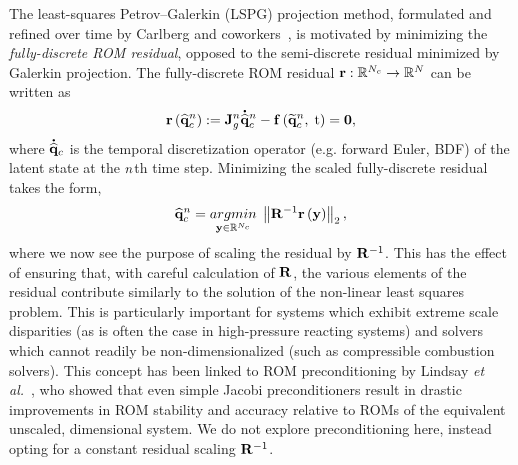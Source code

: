 The least-squares Petrov--Galerkin (LSPG) projection method, formulated and refined over time by Carlberg and coworkers~\cite{Carlberg2010,Carlberg2013,Carlberg2017}, is motivated by minimizing the \textit{fully-discrete ROM residual}, opposed to the semi-discrete residual minimized by Galerkin projection. The fully-discrete ROM residual $\mathbf{r}: \mathbb{R}^{N_c} \rightarrow \mathbb{R}^{N}$ can be written as
%
\begin{equation}
    \mathbf{r}\left(\mathbf{\widehat{q}}_{c}^{n}\right) := \mathbf{J}_{g}^{n} \accentset{\mbox{\large\bfseries .}}{\mathbf{\widehat{q}}}_{c}^{n} - \mathbf{f} \left(\mathbf{\widetilde{q}}_{c}^{n}, \; \text{t}\right) = \mathbf{0},
\end{equation}
%
where $\accentset{\mbox{\large\bfseries .}}{\mathbf{\widehat{q}}}_{c}$ is the temporal discretization operator (e.g. forward Euler, BDF) of the latent state at the $n$th time step. Minimizing the scaled fully-discrete residual takes the form,
%
\begin{equation}\label{eq:lspgLS}
    \consVecCoef^{\timeIdx} = \argmin{\dummyVec \inROne{\numConsModes}} \left\Vert \resScaleInv \resFunc{\dummyVec} \right\Vert_2,
\end{equation}
%
where we now see the purpose of scaling the residual by $\resScaleInv$. This has the effect of ensuring that, with careful calculation of $\resScale$, the various elements of the residual contribute similarly to the solution of the non-linear least squares problem. This is particularly important for systems which exhibit extreme scale disparities (as is often the case in high-pressure reacting systems) and solvers which cannot readily be non-dimensionalized (such as compressible combustion solvers). This concept has been linked to ROM preconditioning by Lindsay \textit{et al.}~\cite{Lindsay2022}, who showed that even simple Jacobi preconditioners result in drastic improvements in ROM stability and accuracy relative to ROMs of the equivalent unscaled, dimensional system. We do not explore preconditioning here, instead opting for a constant residual scaling $\resScaleInv$.

